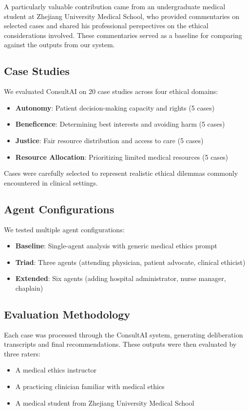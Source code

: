 \documentclass[11pt]{article}
\begin{document}
A particularly valuable contribution came from an undergraduate medical student at Zhejiang University Medical School, who provided commentaries on selected cases and shared his professional perspectives on the ethical considerations involved. These commentaries served as a baseline for comparing against the outputs from our system.

\subsection{Case Studies}

We evaluated ConsultAI on 20 case studies across four ethical domains:
\begin{itemize}
    \item \textbf{Autonomy}: Patient decision-making capacity and rights (5 cases)
    \item \textbf{Beneficence}: Determining best interests and avoiding harm (5 cases)
    \item \textbf{Justice}: Fair resource distribution and access to care (5 cases)
    \item \textbf{Resource Allocation}: Prioritizing limited medical resources (5 cases)
\end{itemize}

Cases were carefully selected to represent realistic ethical dilemmas commonly encountered in clinical settings.

\subsection{Agent Configurations}

We tested multiple agent configurations:
\begin{itemize}
    \item \textbf{Baseline}: Single-agent analysis with generic medical ethics prompt
    \item \textbf{Triad}: Three agents (attending physician, patient advocate, clinical ethicist)
    \item \textbf{Extended}: Six agents (adding hospital administrator, nurse manager, chaplain)
\end{itemize}

\subsection{Evaluation Methodology}

Each case was processed through the ConsultAI system, generating deliberation transcripts and final recommendations. These outputs were then evaluated by three raters:
\begin{itemize}
    \item A medical ethics instructor
    \item A practicing clinician familiar with medical ethics
    \item A medical student from Zhejiang University Medical School
\end{itemize}
\end{document}

